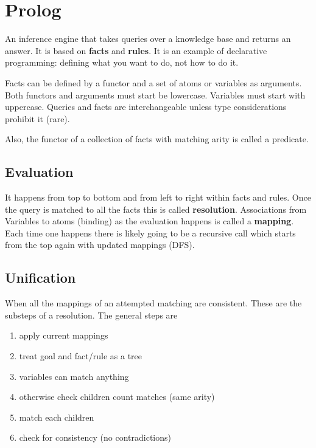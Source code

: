 \section{Prolog}
An inference engine that takes queries over a knowledge base and returns
an answer. It is based on \textbf{facts} and \textbf{rules}. It is an
example of declarative programming: defining what you want to do, not
how to do it.

Facts can be defined by a functor and a set of atoms or variables as
arguments. Both functors and arguments must start be lowercase.
Variables must start with uppercase. Queries and facts are
interchangeable unless type considerations prohibit it (rare).

Also, the functor of a collection of facts with matching arity is called
a predicate.

\subsection*{Evaluation}
It happens from top to bottom and from left to right within facts and
rules. Once the query is matched to all the facts this is called
\textbf{resolution}. Associations from Variables to atoms (binding) as
the evaluation happens is called a \textbf{mapping}. Each time one
happens there is likely going to be a recursive call which starts from
the top again with updated mappings (DFS).

\subsection*{Unification}
When all the mappings of an attempted matching are consistent. These are
the substeps of a resolution. The general steps are
\begin{enumerate}
  \item apply current mappings
  \item treat goal and fact/rule as a tree
  \item variables can match anything
  \item otherwise check children count matches (same arity)
  \item match each children
  \item check for consistency (no contradictions)
\end{enumerate}